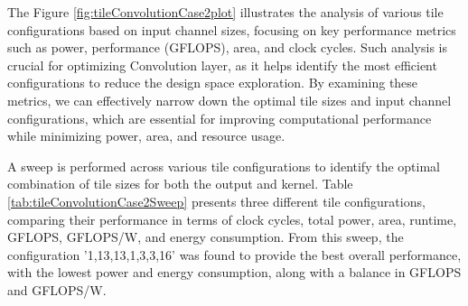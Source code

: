 The Figure \ref{fig:tileConvolutionCase2plot} illustrates the analysis of various tile configurations based on input channel sizes, focusing on key performance metrics such as power, performance (GFLOPS), area, and clock cycles. Such analysis is crucial for optimizing Convolution layer, as it helps identify the most efficient configurations to reduce the design space exploration. By examining these metrics, we can effectively narrow down the optimal tile sizes and input channel configurations, which are essential for improving computational performance while minimizing power, area, and resource usage.
\\
\begin{table}[H]
\centering
\caption{Loop tiling sweep}
\label{tab:tileConvolutionCase2Sweep}
\end{table}

 A sweep is performed across various tile configurations to identify the optimal combination of tile sizes for both the output and kernel. Table \ref{tab:tileConvolutionCase2Sweep} presents three different tile configurations, comparing their performance in terms of clock cycles, total power, area, runtime, GFLOPS, GFLOPS/W, and energy consumption. From this sweep, the configuration '1,13,13,1,3,3,16' was found to provide the best overall performance, with the lowest power and energy consumption, along with a balance in GFLOPS and GFLOPS/W.
\\

\begin{table}[H]
\centering
\caption{Loop tiling result}
\label{tab:tileConvolutionCase2Results}
\end{table}

